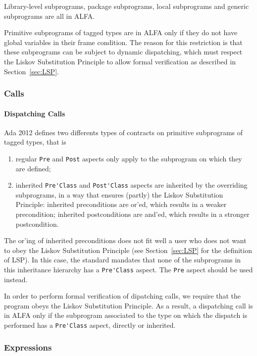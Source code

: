 \documentclass{article}
\begin{document}
Library-level subprograms, package subprograms, local subprograms and generic
subprograms are all in ALFA.

Primitive subprograms of tagged types are in ALFA only if they do not have
global variables in their frame condition. The reason for this restriction is
that these subprograms can be subject to dynamic dispatching, which must
respect the Liskov Substitution Principle to allow formal verification as
described in Section~\ref{sec:LSP}.

\subsubsection{Calls}
\label{ALFA:calls}

\paragraph{Dispatching Calls}

Ada 2012 defines two differents types of contracts on primitive subprograms of
tagged types, that is 
\begin{enumerate}
\item regular \verb|Pre| and \verb|Post| aspects only apply to the subprogram
  on which they are defined;
\item inherited \verb|Pre'Class| and \verb|Post'Class| aspects are inherited by
  the overriding subprograms, in a way that ensures (partly) the Liskov
  Substitution Principle: inherited preconditions are or'ed, which results in a
  weaker precondition; inherited postconditions are and'ed, which results in a
  stronger postcondition.
\end{enumerate}

The or'ing of inherited preconditions does not fit well a user who does not
want to obey the Liskov Substitution Principle (see Section~\ref{sec:LSP} for
the definition of LSP). In this case, the standard mandates that none of the
subprograms in this inheritance hierarchy has a \verb|Pre'Class| aspect. The
\verb|Pre| aspect should be used instead.

In order to perform formal verification of dipatching calls, we require that
the program obeys the Liskov Substitution Principle. As a result, a dispatching
call is in ALFA only if the subprogram associated to the type on which the
dispatch is performed has a \verb|Pre'Class| aspect, directly or inherited.

\subsubsection{Expressions}
\end{document}
